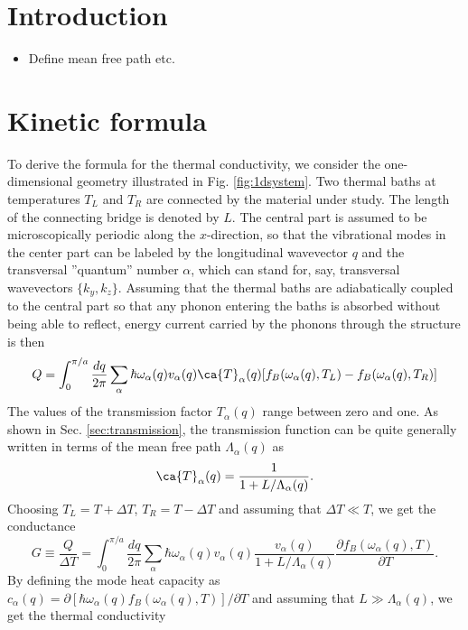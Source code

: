 
\section{Introduction}

\begin{itemize}
 \item Define mean free path etc.
\end{itemize}


\section{Kinetic formula}

To derive the formula for the thermal conductivity, we consider the one-dimensional geometry illustrated in Fig. \ref{fig:1dsystem}. Two thermal baths at temperatures $T_L$ and $T_R$ are connected by the material under study. The length of the connecting bridge is denoted by $L$. The central part is assumed to be microscopically periodic along the $x$-direction, so that the vibrational modes in the center part can be labeled by the longitudinal wavevector $q$ and the transversal ''quantum'' number $\alpha$, which can stand for, say, transversal wavevectors $\{k_y,k_z\}$. Assuming that the thermal baths are adiabatically coupled to the central part so that any phonon entering the baths is absorbed without being able to reflect, energy current carried by the phonons through the structure is then
\begin{equation}
 Q  = \int_0^{\pi/a} \frac{dq}{2\pi} \sum_{\alpha} \hbar \omega_{\alpha}(q) v_{\alpha}(q) \ca{T}_{\alpha}(q) [f_B(\omega_{\alpha}(q),T_L)-f_B(\omega_{\alpha}(q),T_R)]
\end{equation}
The values of the transmission factor $T_{\alpha}(q)$ range between zero and one. As shown in Sec. \ref{sec:transmission}, the transmission function can be quite generally written in terms of the mean free path $\Lambda_{\alpha}(q)$ as
\begin{equation}
 \ca{T}_{\alpha}(q) = \frac{1}{1+L/\Lambda_{\alpha}(q)}.
\end{equation}
Choosing $T_L=T+\Delta T$, $T_R=T-\Delta T$ and assuming that $\Delta T\ll T$, we get the conductance
\begin{equation}
 G \equiv \frac{Q}{\Delta T} = \int_0^{\pi/a} \frac{dq}{2\pi} \sum_{\alpha} \hbar \omega_{\alpha}(q) v_{\alpha}(q) \frac{v_{\alpha}(q)}{1+L/\Lambda_{\alpha}(q)}\frac{\partial f_B(\omega_{\alpha}(q),T)}{\partial T}.
\end{equation}
By defining the mode heat capacity as $c_{\alpha}(q) = \partial [\hbar \omega_{\alpha}(q) f_B(\omega_{\alpha}(q),T)]/\partial T$ and assuming that $L\gg \Lambda_{\alpha}(q)$, we get the thermal conductivity
